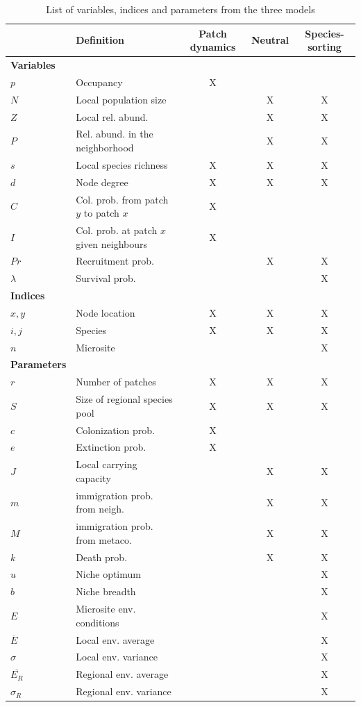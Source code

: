 \documentclass[12pt]{article}
\begin{document}
\begin{table}[l]
	\centering
	\begin{tabular}{llccc}
	\hline
	& Definition & Patch dynamics & Neutral & Species-sorting \\
	\hline
	\textbf{Variables} &   &  &  &  \\
	$p$ & Occupancy & X &  &  \\
	$N$ & Local population size &  & X & X \\
	$Z$ & Local rel. abund. & & X & X \\
	$P$ & Rel. abund. in the neighborhood & & X & X \\
	$s$ & Local species richness & X & X & X \\
	$d$ & Node degree & X & X & X \\
	$C$ & Col. prob. from patch $y$ to patch $x$ & X & & \\
	$I$ & Col. prob. at patch $x$ given neighbours & X & & \\
	$Pr$ & Recruitment prob. & & X & X \\
	$\lambda$ & Survival prob. & & & X \\

	\textbf{Indices} & & & &\\
	$x,y$ & Node location & X & X & X \\
	$i,j$ & Species & X & X & X\\
	$n$ & Microsite & & & X \\

	\textbf{Parameters} & & & &\\
	$r$ & Number of patches & X & X & X \\
	$S$ & Size of regional species pool & X & X & X \\
	$c$ & Colonization prob. & X & & \\
	$e$ & Extinction prob. & X & & \\
	$J$ & Local carrying capacity & & X & X \\
	$m$ & immigration prob. from neigh. & & X & X \\
	$M$ & immigration prob. from metaco. & & X & X \\
	$k$ & Death prob. & & X & X \\
	$u$ & Niche optimum & & & X \\
	$b$ & Niche breadth & & & X \\
	$E$ & Microsite env. conditions & & & X \\
	$\overline{E}$ & Local env. average & & & X \\
	$\sigma$ & Local env. variance & & & X \\
	$\overline{E_R}$ & Regional env. average & & & X \\
	$\sigma_R$ & Regional env. variance & & & X \\
	\hline
	\end{tabular}
	\caption{List of variables, indices and parameters from the three models}
\end{table}
\newpage
\end{document}
